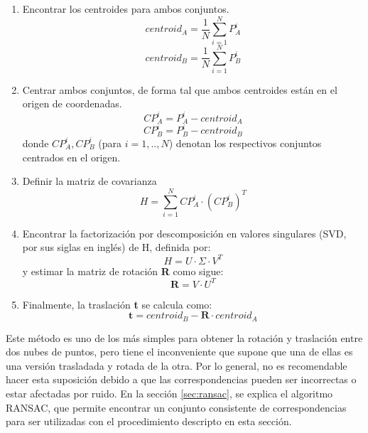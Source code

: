 \begin{enumerate}

\item Encontrar los centroides para ambos conjuntos.
\begin{equation}
centroid_{A} = \frac{1}{N} \sum_{i = 1}^{N} P_{A}^{i}
\end{equation}
\begin{equation}
centroid_{B} = \frac{1}{N} \sum_{i = 1}^{N} P_{B}^{i}
\end{equation}

\item Centrar ambos conjuntos, de forma tal que ambos centroides están en el origen de coordenadas.
\begin{equation}
CP_{A}^{i} = P_{A}^{i} - centroid_{A}
\end{equation}
\begin{equation}
CP_{B}^{i} = P_{B}^{i} - centroid_{B}
\end{equation}
donde $CP_{A}^{i}, CP_{B}^{i}$ (para $i=1,..,N$) denotan los respectivos conjuntos centrados en el origen.

\item Definir la matriz de covarianza
\begin{equation}
H = \sum_{i=1}^{N} CP_{A}^{i} \cdot (CP_{B}^{i})^{T}
\end{equation}

\item Encontrar la factorización por descomposición en valores singulares (SVD, por sus siglas en inglés) \cite{wiki-svd} de H, definida por:
\begin{equation}
H = U \cdot \Sigma \cdot V^{T}
\end{equation}
y estimar la matriz de rotación \textbf{R} como sigue:
\begin{equation}
\textbf{R} = V \cdot U^{T}
\end{equation}

\item Finalmente, la traslación \textbf{t} se calcula como:
\begin{equation}
\textbf{t} = centroid_{B} - \textbf{R} \cdot centroid_{A}
\end{equation}

\end{enumerate}

Este método es uno de los más simples para obtener la rotación y traslación entre dos nubes de puntos, pero tiene el inconveniente que supone que una de ellas es una versión trasladada y rotada de la otra. Por lo general, no es recomendable hacer esta suposición debido a que las correspondencias pueden ser incorrectas o estar afectadas por ruido. En la sección \ref{sec:ransac}, se explica el algoritmo RANSAC, que permite encontrar un conjunto consistente de correspondencias para ser utilizadas con el procedimiento descripto en esta sección.

